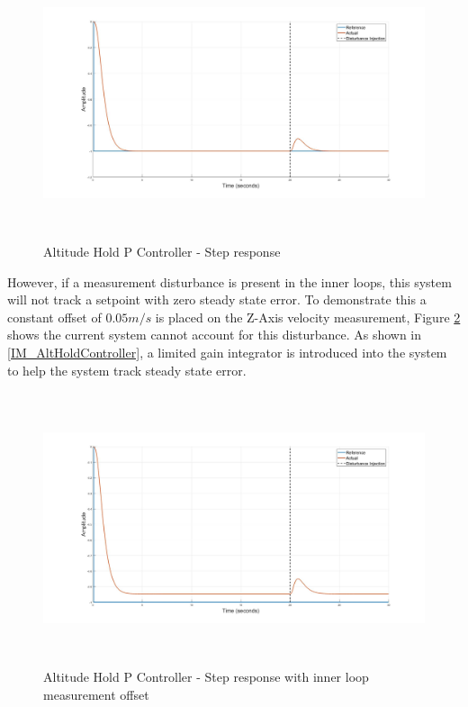 		 \begin{figure}[H]
		 	\centering
		 	\includegraphics[height = 8cm]{../Design/Matlab/Controllers/altitude_step_p_no_dist.jpg}
		 	\caption{Altitude Hold P Controller -  Step response}
		 	\label{IM_AltHoldStep}
		 \end{figure}
		 
		 However, if a measurement disturbance is present in the inner loops, this system will not track a setpoint with zero steady state error. To demonstrate this a constant offset of $0.05m/s$ is placed on the Z-Axis velocity measurement, Figure \ref{IM_AltHoldPDistStep} shows the current system cannot account for this disturbance. As shown in \ref{IM_AltHoldController}, a limited gain integrator is introduced into the system to help the system track steady state error. 
		 
		 \begin{figure}[H]
		 	\centering
		 	\includegraphics[height = 8cm]{../Design/Matlab/Controllers/altitude_step_p_dist.jpg}
		 	\caption{Altitude Hold P Controller -  Step response with inner loop measurement offset}
		 	\label{IM_AltHoldPDistStep}
		 \end{figure}
		 
